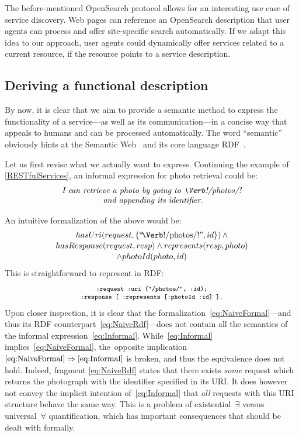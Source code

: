 \documentclass[runningheads,a4paper, twocolumn]{llncs}
\begin{document}
The before-mentioned OpenSearch protocol allows for an interesting use case of service discovery. Web pages can reference an OpenSearch description that user agents can process and offer site-specific search automatically. If we adapt this idea to our approach, user agents could dynamically offer services related to a current resource, if the resource points to a service description.

\subsection{Deriving a functional description}
\label{subsec:FunctionDescription}
By now, it is clear that we aim to provide a semantic method to express the functionality of a service---as well as its communication---in a concise way that appeals to humans and can be processed automatically. The word ``semantic'' obviously hints at the Semantic Web~\cite{SemanticWeb} and its core language RDF~\cite{RDF}.

Let us first revise what we actually want to express. Continuing the example of \autoref{RESTfulServices}, an informal expression for photo retrieval could be:
\begin{multline}\label{eq:Informal}
    \textit{I can retrieve a photo by going to \Verb!/photos/!}\\[-.3em]
    \textit{ and appending its identifier.}
\end{multline}

\noindent An intuitive formalization of the above would be:
\begin{multline}\label{eq:NaiveFormal}
    \makebox[5.2cm]{$hasUri(request, \{\mbox{``\!\Verb!/photos/!''}, id\})\, \land$} \\[-.2em]
    hasResponse(request, resp) \land represents(resp, photo)\\[-.2em]
    \land photoId(photo, id)
\end{multline}
This is straightforward to represent in RDF:
\begin{multline}\label{eq:NaiveRdf}
    \fontsize{8}{10}\texttt{:request :uri ("/photos/", :id);} \\[-.5em]
    \fontsize{8}{10}\texttt{:response [ :represents [:photoId :id] ].}
\end{multline}
Upon closer inspection, it is clear that the formalization~\ref{eq:NaiveFormal}---and thus its RDF counterpart~\ref{eq:NaiveRdf}---does not contain all the semantics of the informal expression~\ref{eq:Informal}. While~\ref{eq:Informal} implies~\ref{eq:NaiveFormal}, the~opposite implication \mbox{$\ref{eq:NaiveFormal} \Rightarrow \ref{eq:Informal}$} is broken, and thus the equivalence does not hold. Indeed, fragment \ref{eq:NaiveRdf} states that there exists \emph{some} request which returns the photograph with the identifier specified in its URI. It does however not convey the implicit intention of~\ref{eq:Informal} that \emph{all} requests with this URI structure behave the same way. This is a problem of existential~$\exists$ versus universal~$\forall$ quantification, which has important consequences that should be dealt with formally.
\end{document}

